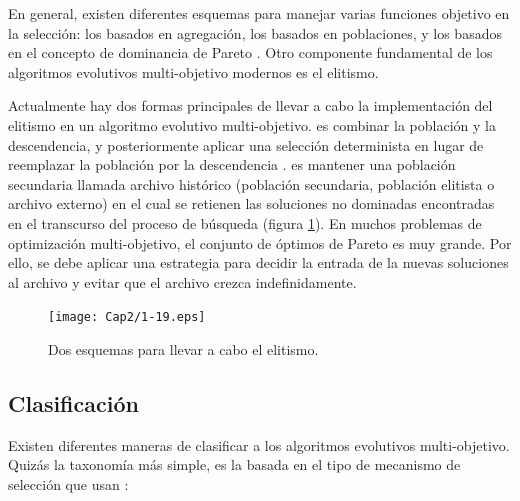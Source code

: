   En general, existen diferentes esquemas para manejar varias funciones objetivo en la selecci\'on: los basados en agregaci\'on, los basados 
  en poblaciones, y los basados en el concepto de dominancia de Pareto \cite{Zitzler99}. Otro componente fundamental de los algoritmos
  evolutivos multi-objetivo modernos es el elitismo.

  Actualmente hay dos formas principales de llevar a cabo la implementaci\'on del elitismo en un algoritmo evolutivo multi-objetivo.
  \DIFdelbegin {}\DIFdelend \DIFaddbegin {}\DIFaddend es combinar la poblaci\'on \DIFdelbegin {}\DIFdelend \DIFaddbegin {}\DIFaddend y la descendencia\DIFdelbegin {}\DIFdelend , y posteriormente aplicar una selecci\'on determinista 
  en lugar de reemplazar la \DIFdelbegin {}\DIFdelend poblaci\'on \DIFaddbegin {}\DIFaddend por la descendencia \cite{deb02}. \DIFdelbegin {}\DIFdelend \DIFaddbegin {}\DIFaddend es mantener una poblaci\'on secundaria 
  llamada archivo hist\'orico (poblaci\'on secundaria, poblaci\'on elitista o archivo externo) en el cual se retienen las soluciones no 
  dominadas encontradas en el transcurso del proceso de b\'usqueda \cite{Zitzler99}(\DIFdelbegin {}\DIFdelend figura \ref{fig:elitismo}). En muchos problemas 
  de optimizaci\'on multi-objetivo, el conjunto de \'optimos de Pareto es muy grande. Por ello, se debe aplicar una estrategia para decidir la entrada 
  de la nuevas soluciones al archivo y evitar que el archivo crezca indefinidamente.

    \begin{figure}[H]
	\centering
	\texttt{[image: Cap2/1-19.eps]}
	  \caption{Dos esquemas para llevar a cabo el elitismo.}
      \label{fig:elitismo}
      \end{figure}

  \subsection{Clasificaci\'on}

  Existen diferentes maneras de clasificar a los algoritmos evolutivos multi-objetivo. Quiz\'as la taxonom\'ia m\'as simple, 
  es la basada en el tipo de mecanismo de selecci\'on que usan \cite{EASMC}:

